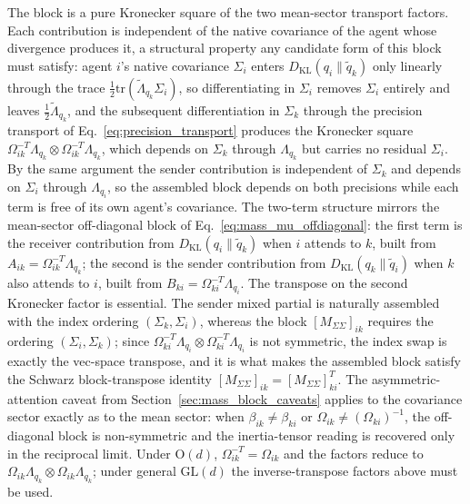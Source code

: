 \documentclass[11pt]{article}
\begin{document}
The block is a pure Kronecker square of the two mean-sector transport factors. Each contribution is independent of the native covariance of the agent whose divergence produces it, a structural property any candidate form of this block must satisfy: agent $i$'s native covariance $\Sigma_i$ enters $D_{\mathrm{KL}}(q_i \| \tilde{q}_k)$ only linearly through the trace $\frac{1}{2}\mathrm{tr}(\tilde{\Lambda}_{q_k}\Sigma_i)$, so differentiating in $\Sigma_i$ removes $\Sigma_i$ entirely and leaves $\frac{1}{2}\tilde{\Lambda}_{q_k}$, and the subsequent differentiation in $\Sigma_k$ through the precision transport of Eq.~\eqref{eq:precision_transport} produces the Kronecker square $\Omega_{ik}^{-T}\Lambda_{q_k} \otimes \Omega_{ik}^{-T}\Lambda_{q_k}$, which depends on $\Sigma_k$ through $\Lambda_{q_k}$ but carries no residual $\Sigma_i$. By the same argument the sender contribution is independent of $\Sigma_k$ and depends on $\Sigma_i$ through $\Lambda_{q_i}$, so the assembled block depends on both precisions while each term is free of its own agent's covariance. The two-term structure mirrors the mean-sector off-diagonal block of Eq.~\eqref{eq:mass_mu_offdiagonal}: the first term is the receiver contribution from $D_{\mathrm{KL}}(q_i \| \tilde{q}_k)$ when $i$ attends to $k$, built from $A_{ik} = \Omega_{ik}^{-T}\Lambda_{q_k}$; the second is the sender contribution from $D_{\mathrm{KL}}(q_k \| \tilde{q}_i)$ when $k$ also attends to $i$, built from $B_{ki} = \Omega_{ki}^{-T}\Lambda_{q_i}$. The transpose on the second Kronecker factor is essential. The sender mixed partial is naturally assembled with the index ordering $(\Sigma_k, \Sigma_i)$, whereas the block $[M_{\Sigma\Sigma}]_{ik}$ requires the ordering $(\Sigma_i, \Sigma_k)$; since $\Omega_{ki}^{-T}\Lambda_{q_i} \otimes \Omega_{ki}^{-T}\Lambda_{q_i}$ is not symmetric, the index swap is exactly the vec-space transpose, and it is what makes the assembled block satisfy the Schwarz block-transpose identity $[M_{\Sigma\Sigma}]_{ik} = [M_{\Sigma\Sigma}]_{ki}^T$. The asymmetric-attention caveat from Section~\ref{sec:mass_block_caveats} applies to the covariance sector exactly as to the mean sector: when $\beta_{ik} \neq \beta_{ki}$ or $\Omega_{ik} \neq (\Omega_{ki})^{-1}$, the off-diagonal block is non-symmetric and the inertia-tensor reading is recovered only in the reciprocal limit. Under $\mathrm{O}(d)$, $\Omega_{ik}^{-T} = \Omega_{ik}$ and the factors reduce to $\Omega_{ik}\Lambda_{q_k} \otimes \Omega_{ik}\Lambda_{q_k}$; under general $\mathrm{GL}(d)$ the inverse-transpose factors above must be used.
\end{document}
